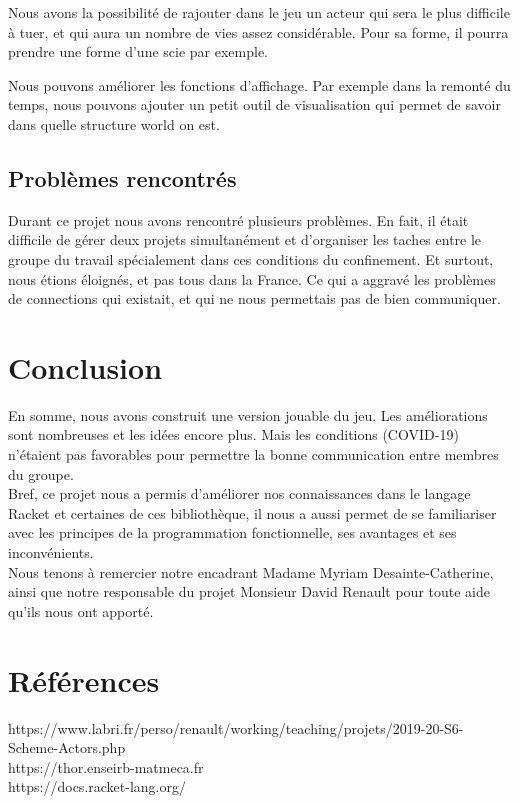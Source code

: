 \documentclass[a4paper]{article}
\begin{document}
Nous avons la possibilité de rajouter dans le jeu un acteur qui sera le plus difficile à tuer, et qui aura un nombre de vies assez considérable. Pour sa forme, il pourra prendre une forme d'une scie par exemple.

Nous pouvons améliorer les fonctions d'affichage. Par exemple dans la remonté du temps, nous pouvons ajouter un petit outil de visualisation qui permet de savoir dans quelle structure world on est.

\subsection{Problèmes rencontrés}
Durant ce projet nous avons rencontré plusieurs problèmes. En fait, il était difficile de gérer deux projets simultanément et d'organiser les taches entre le groupe du travail spécialement dans ces conditions du confinement. Et surtout, nous étions éloignés, et pas tous dans la France. Ce qui a aggravé les problèmes de connections qui existait, et qui ne nous permettais pas de bien communiquer.

\section{Conclusion}
En somme, nous avons construit une version jouable du jeu. Les améliorations sont nombreuses et les idées encore plus. Mais les conditions (COVID-19) n'étaient pas favorables pour permettre la bonne communication entre membres du groupe.\\
Bref, ce projet nous a permis d'améliorer nos connaissances dans le langage Racket et certaines de ces bibliothèque, il nous a aussi permet de se familiariser avec les principes de la programmation fonctionnelle, ses avantages et ses inconvénients. \\
Nous tenons à remercier notre encadrant Madame Myriam Desainte-Catherine, ainsi que notre responsable du projet Monsieur David Renault pour toute aide qu'ils nous ont apporté.
\section{Références}
https://www.labri.fr/perso/renault/working/teaching/projets/2019-20-S6-Scheme-Actors.php \\
https://thor.enseirb-matmeca.fr \\
https://docs.racket-lang.org/
\end{document}
